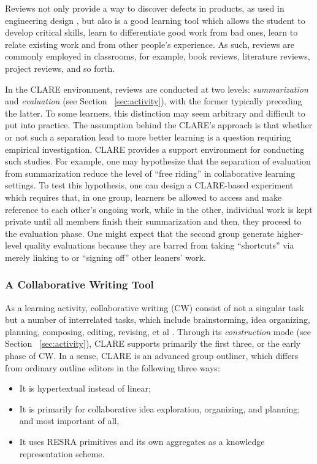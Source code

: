 Reviews not only provide a way to discover defects in products, as used in
engineering design \cite{Freedman90}, but also is a good learning tool
which allows the student to develop critical skills, learn to differentiate
good work from bad ones, learn to relate existing work and from other
people's experience. As such, reviews are commonly employed in classrooms,
for example, book reviews, literature reviews, project reviews, and so
forth. 

In the CLARE environment, reviews are conducted at two levels: {\it
summarization\/} and {\it evaluation\/} (see Section ~\ref{sec:activity}),
with the former typically preceding the latter. To some learners, this
distinction may seem arbitrary and difficult to put into practice. The
assumption behind the CLARE's approach is that whether or not such a
separation lead to more better learning is a question requiring empirical
investigation. CLARE provides a support environment for conducting such
studies. For example, one may hypothesize that the separation of evaluation
from summarization reduce the level of ``free riding'' in collaborative
learning settings. To test this hypothesis, one can design a CLARE-based
experiment which requires that, in one group, learners be allowed to access
and make reference to each other's ongoing work, while in the other,
individual work is kept private until all members finish their
summarization and then, they proceed to the evaluation phase. One might
expect that the second group generate higher-level quality evaluations
because they are barred from taking ``shortcuts'' via merely linking to or
``signing off'' other leaners' work.


\subsubsection{A Collaborative Writing Tool}
\label{sec:co-write}

As a learning activity, collaborative writing (CW) consist of not a
singular task but a number of interrelated tasks, which include
brainstorming, idea organizing, planning, composing, editing, revising, et
al \cite{Baecker93}. Through its {\it construction\/} mode (see Section
~\ref{sec:activity}), CLARE supports primarily the first three, or the early
phase of CW. In a sense, CLARE is an advanced group outliner, which differs
from ordinary outline editors in the following three ways:

\begin{itemize}
\item It is hypertextual instead of linear;

\item It is primarily for collaborative idea exploration, organizing, and
  planning; and most important of all, 

\item It uses RESRA primitives and its own aggregates as a knowledge
  representation scheme.
\end{itemize}

